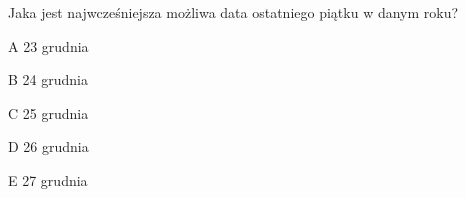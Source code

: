 \begin{tresc}
Jaka jest najwcześniejsza możliwa data ostatniego piątku w danym roku?
\end{tresc}
\begin{wariant}{A} 23 grudnia \end{wariant}
\begin{wariant}{B} 24 grudnia \end{wariant}
\begin{wariant}{C} 25 grudnia \end{wariant}
\begin{wariant}{D} 26 grudnia \end{wariant}
\begin{wariant}{E} 27 grudnia \end{wariant}
